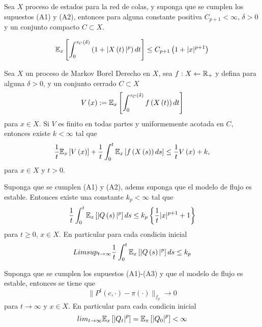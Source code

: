 \begin{Prop}
Sea $X$ proceso de estados para la red de colas, y suponga que se
cumplen los supuestos (A1) y (A2), entonces para alguna constante
positiva $C_{p+1}<\infty$, $\delta>0$ y un conjunto compacto
$C\subset X$.

\begin{equation}\label{Eq.5.4}
\mathbb{E}_{x}\left[\int_{0}^{\tau_{C}\left(\delta\right)}\left(1+|X\left(t\right)|^{p}\right)dt\right]\leq
C_{p+1}\left(1+|x|^{p+1}\right)
\end{equation}
\end{Prop}

\begin{Prop}
Sea $X$ un proceso de Markov Borel Derecho en $X$, sea
$f:X\leftarrow\mathbb{R}_{+}$ y defina para alguna $\delta>0$, y un
conjunto cerrado $C\subset X$
\[V\left(x\right):=\mathbb{E}_{x}\left[\int_{0}^{\tau_{C}\left(\delta\right)}f\left(X\left(t\right)\right)dt\right]\]
para $x\in X$. Si $V$ es finito en todas partes y uniformemente
acotada en $C$, entonces existe $k<\infty$ tal que
\begin{equation}\label{Eq.5.11}
\frac{1}{t}\mathbb{E}_{x}\left[V\left(x\right)\right]+\frac{1}{t}\int_{0}^{t}\mathbb{E}_{x}\left[f\left(X\left(s\right)\right)ds\right]\leq\frac{1}{t}V\left(x\right)+k,
\end{equation}
para $x\in X$ y $t>0$.
\end{Prop}


\begin{Teo}
Suponga que se cumplen (A1) y (A2), adems suponga que el modelo
de flujo es estable. Entonces existe una constante $k_{p}<\infty$
tal que
\begin{equation}\label{Eq.5.13}
\frac{1}{t}\int_{0}^{t}\mathbb{E}_{x}\left[|Q\left(s\right)|^{p}\right]ds\leq
k_{p}\left\{\frac{1}{t}|x|^{p+1}+1\right\}
\end{equation}
para $t\geq0$, $x\in X$. En particular para cada condicin inicial
\begin{equation}\label{Eq.5.14}
Limsup_{t\rightarrow\infty}\frac{1}{t}\int_{0}^{t}\mathbb{E}_{x}\left[|Q\left(s\right)|^{p}\right]ds\leq
k_{p}
\end{equation}
\end{Teo}

\begin{Teo}\label{Tma.6.2}
Suponga que se cumplen los supuestos (A1)-(A3) y que el modelo de
flujo es estable, entonces se tiene que
\[\parallel P^{t}\left(c,\cdot\right)-\pi\left(\cdot\right)\parallel_{f_{p}}\rightarrow0\]
para $t\rightarrow\infty$ y $x\in X$. En particular para cada
condicin inicial
\[lim_{t\rightarrow\infty}\mathbb{E}_{x}\left[\left|Q_{t}\right|^{p}\right]=\mathbb{E}_{\pi}\left[\left|Q_{0}\right|^{p}\right]<\infty\]
\end{Teo}


